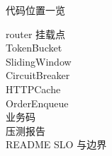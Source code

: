 \documentclass[aspectratio=169,11pt]{beamer}
\begin{document}
\begin{frame}[shrink]{代码位置一览}
\footnotesize
\begin{description}
  \item[router 挂载点]
  \item[TokenBucket]
  \item[SlidingWindow]
  \item[CircuitBreaker]
  \item[HTTPCache]
  \item[OrderEnqueue]
  \item[业务码]
  \item[压测报告]
  \item[README SLO 与边界]
\end{description}
\end{frame}
\end{document}
